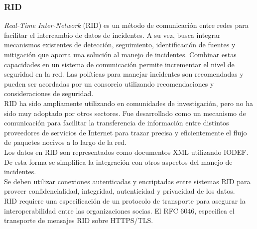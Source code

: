 \subsubsection{RID}

\textit{Real-Time Inter-Network} (RID) es un método de comunicación entre redes para 
facilitar el intercambio de datos de incidentes. A su vez, busca integrar 
mecanismos existentes de detección, seguimiento, identificación de fuentes y 
mitigación que aporta una solución al manejo de incidentes. Combinar estas 
capacidades en un sistema de comunicación permite incrementar el nivel de 
seguridad en la red. Las políticas para manejar incidentes son recomendadas y 
pueden ser acordadas por un consorcio utilizando recomendaciones y 
consideraciones de seguridad.\\

RID ha sido ampliamente utilizando en comunidades de investigación, pero no ha 
sido muy adoptado por otros sectores. Fue desarrollado como un mecanismo de 
comunicación para facilitar la transferencia de información entre distintos 
proveedores de servicios de Internet para trazar precisa y eficientemente el 
flujo de paquetes nocivos a lo largo de la red.\\

Los datos en RID son representados como documentos XML utilizando IODEF. De esta 
forma se simplifica la integración con otros aspectos del manejo de incidentes.\\ 

Se deben utilizar 
conexiones autenticadas y encriptadas entre sistemas RID para proveer 
confidencialidad, integridad, autenticidad y privacidad de los datos. \\

RID requiere una 
especificación de un protocolo de transporte para asegurar la interoperabilidad 
entre las organizaciones socias. El RFC 6046, especifica 
el transporte de mensajes RID sobre HTTPS/TLS. 












